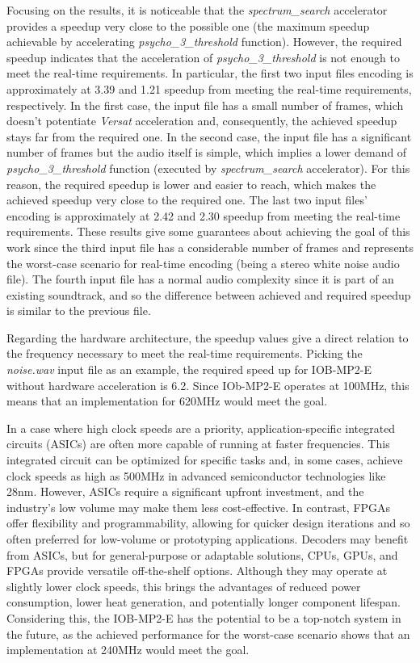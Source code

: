Focusing on the results, it is noticeable that the \textit{spectrum\_search} accelerator provides a speedup very close to the possible one (the maximum speedup achievable by accelerating \textit{psycho\_3\_threshold} function).
However, the required speedup indicates that the acceleration of \textit{psycho\_3\_threshold} is not enough to meet the real-time requirements. 
In particular, the first two input files encoding is approximately at 3.39 and 1.21 speedup from meeting the real-time requirements, respectively. In the first case, the input file has a small number of frames, which doesn't potentiate \textit{Versat} acceleration and, consequently, the achieved speedup stays far from the required one.
In the second case, the input file has a significant number of frames but the audio itself is simple, which implies a lower demand of \textit{psycho\_3\_threshold} function (executed by \textit{spectrum\_search} accelerator). For this reason, the required speedup is lower and easier to reach, which makes the achieved speedup very close to the required one.
The last two input files' encoding is approximately at 2.42 and 2.30 speedup from meeting the real-time requirements. These results give some guarantees about achieving the goal of this work since the third input file has a considerable number of frames and represents the worst-case scenario for real-time encoding (being a stereo white noise audio file). The fourth input file has a normal audio complexity since it is part of an existing soundtrack, and so the difference between achieved and required speedup is similar to the previous file.

Regarding the hardware architecture, the speedup values give a direct relation to the frequency necessary to meet the real-time requirements. Picking the \textit{noise.wav} input file as an example, the required speed up for IOB-MP2-E without hardware acceleration is 6.2. Since IOb-MP2-E operates at 100MHz, this means that an implementation for 620MHz would meet the goal. 

In a case where high clock speeds are a priority, application-specific integrated circuits (ASICs) are often more capable of running at faster frequencies. This integrated circuit can be optimized for specific tasks and, in some cases, achieve clock speeds as high as 500MHz in advanced semiconductor technologies like 28nm.
However, ASICs require a significant upfront investment, and the industry's low volume may make them less cost-effective. In contrast, FPGAs offer flexibility and programmability, allowing for quicker design iterations and so often preferred for low-volume or prototyping applications.
Decoders may benefit from ASICs, but for general-purpose or adaptable solutions, CPUs, GPUs, and FPGAs provide versatile off-the-shelf options. Although they may operate at slightly lower clock speeds, this brings the advantages of reduced power consumption, lower heat generation, and potentially longer component lifespan.
Considering this, the IOB-MP2-E has the potential to be a top-notch system in the future, as the achieved performance for the worst-case scenario shows that an implementation at 240MHz would meet the goal.